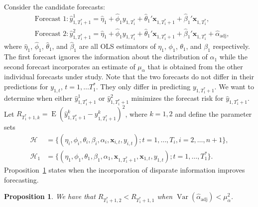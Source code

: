 \documentclass[11pt]{article}
\newcommand{\x}{\textbf{x}}
\newcommand{\Hist}{\mathcal{H}}
\DeclareMathOperator{\E}{E}
\DeclareMathOperator{\Var}{Var}
\newtheorem{prop}{Proposition}
\begin{document}
Consider the candidate forecasts: 
\begin{align*}
  &\text{Forecast 1}: \hat y_{1,T_1^*+1}^1 = \hat\eta_1 
    + \hat\phi_1 y_{1,T_1^*} + \hat\theta_1'\x_{1,T_1^*+1} 
    + \hat\beta_1'\x_{1,T_1^*}, \\
  &\text{Forecast 2}: \hat y_{1,T_1^*+1}^2 = \hat\eta_1 
    + \hat\phi_1 y_{1,T_1^*} + \hat\theta_1'\x_{1,T_1^*+1} 
    + \hat\beta_1'\x_{1,T_1^*} + \hat{\alpha}_{\text{adj}},
\end{align*}
where $\hat\eta_1$, $\hat\phi_1$, $\hat\theta_1$, and $\hat\beta_1$ are all 
OLS estimators of $\eta_1$, $\phi_1$, $\theta_1$, and $\beta_1$ respectively.  
The first forecast ignores the information about the distribution of 
$\alpha_1$ while the second forecast incorporates an estimate of $\mu_\alpha$ 
that is obtained from the other individual forecasts under study.  
Note that the two forecasts do not differ in their predictions for 
$y_{1,t}$, $t = 1,\ldots T_1^*$.  They only differ in predicting 
$y_{1,T_1^*+1}$.  We want to determine when either $\hat y_{1,T_1^*+1}^1$ or 
$\hat y_{1,T_1^*+1}^2$ minimizes the forecast risk for $\hat y_{1,T_1^*+1}$.  
Let $R_{T_1^*+1, k} = \E(\hat y_{1,T_1^*+1}^k - y_{1,T_1^*+1}^k)^2$, where 
$k = 1,2$ and define the parameter sets 
\begin{equation}
\begin{split}
  \Hist &= \{(\eta_i, \phi_i, \theta_i, \beta_i, \alpha_i, \x_{i,t}, y_{i,t}); 
    t = 1,\ldots,T_i, i = 2,\ldots,n+1\}, \\
  \Hist_1 &= \{(\eta_1, \phi_1, \theta_1, \beta_1, \alpha_1, 
    \x_{1,T_1^*+1}, \x_{1,t}, y_{1,t});  t = 1,\ldots,T_1^*\}.
\label{Hist}
\end{split}
\end{equation}
Proposition~\ref{prop:R1R2} states when the incorporation of disparate 
information improves forecasting.

\begin{prop}
We have that $R_{T_1^*+1, 2} < R_{T_1^*+1, 1}$ when 
$\Var(\hat{\alpha}_{\text{adj}}) < \mu_{\alpha}^2$.
\label{prop:R1R2}
\end{prop}
\end{document}
